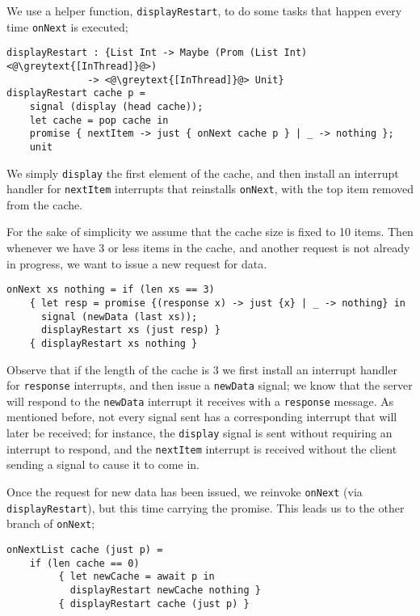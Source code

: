 \documentclass[msc,deptreport,cs]{infthesis} %
\newcommand{\code}[1]{\lstinline{#1}}
\newcommand{\greytext}[1]{\textcolor{black!40}{#1}}
\begin{document}
We use a helper function, \code{displayRestart}, to do some tasks that happen
every time \code{onNext} is executed;

\begin{lstlisting}
displayRestart : {List Int -> Maybe (Prom (List Int) <@\greytext{[InThread]}@>)
              -> <@\greytext{[InThread]}@> Unit}
displayRestart cache p =
    signal (display (head cache));
    let cache = pop cache in
    promise { nextItem -> just { onNext cache p } | _ -> nothing };
    unit
\end{lstlisting}

\noindent We simply \code{display} the first element of the cache, and then
install an interrupt handler for \code{nextItem} interrupts that reinstalls
\code{onNext}, with the top item removed from the cache.

For the sake of simplicity we assume that the cache size is fixed to 10 items.
Then whenever we have 3 or less items in the cache, and another request is not
already in progress, we want to issue a new request for data.

\begin{lstlisting}
onNext xs nothing = if (len xs == 3)
    { let resp = promise {(response x) -> just {x} | _ -> nothing} in
      signal (newData (last xs));
      displayRestart xs (just resp) }
    { displayRestart xs nothing }
\end{lstlisting}

\noindent Observe that if the length of the cache is 3 we first install an
interrupt handler for \code{response} interrupts, and then issue a
\code{newData} signal; we know that the server will respond to the
\code{newData} interrupt it receives with a \code{response} message. As
mentioned before, not every signal sent has a corresponding interrupt that will
later be received; for instance, the \code{display} signal is sent without
requiring an interrupt to respond, and the \code{nextItem} interrupt is received
without the client sending a signal to cause it to come in.

Once the request for new data has been issued, we reinvoke \code{onNext} (via
\code{displayRestart}), but this time carrying the promise. This leads us to the
other branch of \code{onNext};

\begin{lstlisting}
onNextList cache (just p) =
    if (len cache == 0)
         { let newCache = await p in
           displayRestart newCache nothing }
         { displayRestart cache (just p) }
\end{lstlisting}
\end{document}
